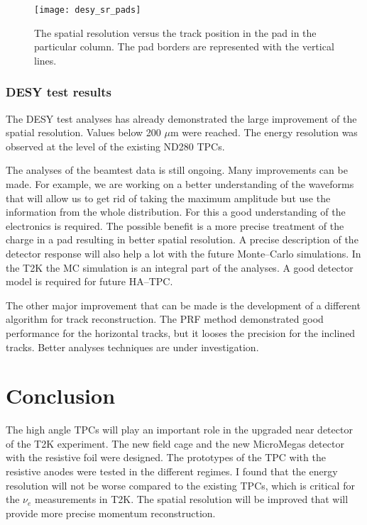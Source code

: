 \documentclass[../main.tex]{subfiles}
\begin{document}
\begin{figure}[!ht]
  \centering
  \texttt{[image: desy\_sr\_pads]}
  \caption{The spatial resolution versus the track position in the pad in the particular column. The pad borders are represented with the vertical lines.}
  \label{fig:tpc:sr_pad}
\end{figure}

\subsubsection{DESY test results}
The DESY test analyses has already demonstrated the large improvement of the spatial resolution. Values below 200 $\mu\text{m}$ were reached. The energy resolution was observed at the level of the existing ND280 TPCs.

The analyses of the beamtest data is still ongoing. Many improvements can be made. For example, we are working on a better understanding of the waveforms that will allow us to get rid of taking the maximum amplitude but use the information from the whole distribution. For this a good understanding of the electronics is required. The possible benefit is a more precise treatment of the charge in a pad resulting in better spatial resolution. A precise description of the detector response will also help a lot with the future Monte--Carlo simulations. In the T2K the MC simulation is an integral part of the analyses. A good detector model is required for future HA--TPC.

The other major improvement that can be made is the development of a different algorithm for track reconstruction. The PRF method demonstrated good performance for the horizontal tracks, but it looses the precision for the inclined tracks. Better analyses techniques are under investigation.

\section{Conclusion}
The high angle TPCs will play an important role in the upgraded near detector of the T2K experiment. The new field cage and the new MicroMegas detector with the resistive foil were designed. The prototypes of the TPC with the resistive anodes were tested in the different regimes. I found that the energy resolution will not be worse compared to the existing TPCs, which is critical for the $\nu_e$ measurements in T2K. The spatial resolution will be improved that will provide more precise momentum reconstruction.
\end{document}
